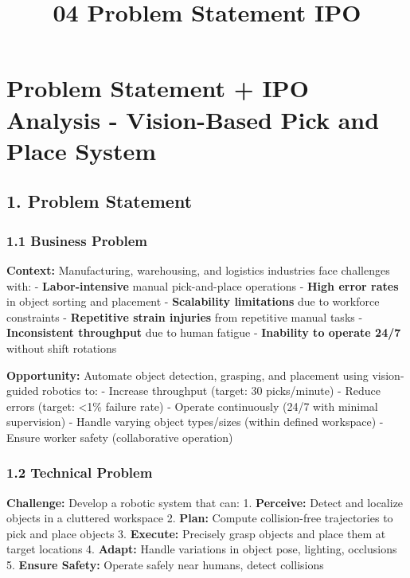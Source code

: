 \documentclass[
]{article}
\title{04 Problem Statement IPO}
\author{}
\date{}
\begin{document}
\maketitle

{
\setcounter{tocdepth}{3}
\tableofcontents
}
\hypertarget{problem-statement-ipo-analysis---vision-based-pick-and-place-system}{%
\section{Problem Statement + IPO Analysis - Vision-Based Pick and Place
System}\label{problem-statement-ipo-analysis---vision-based-pick-and-place-system}}

\hypertarget{problem-statement}{%
\subsection{1. Problem Statement}\label{problem-statement}}

\hypertarget{business-problem}{%
\subsubsection{1.1 Business Problem}\label{business-problem}}

\textbf{Context:} Manufacturing, warehousing, and logistics industries
face challenges with: - \textbf{Labor-intensive} manual pick-and-place
operations - \textbf{High error rates} in object sorting and placement -
\textbf{Scalability limitations} due to workforce constraints -
\textbf{Repetitive strain injuries} from repetitive manual tasks -
\textbf{Inconsistent throughput} due to human fatigue -
\textbf{Inability to operate 24/7} without shift rotations

\textbf{Opportunity:} Automate object detection, grasping, and placement
using vision-guided robotics to: - Increase throughput (target: 30
picks/minute) - Reduce errors (target: \textless1\% failure rate) -
Operate continuously (24/7 with minimal supervision) - Handle varying
object types/sizes (within defined workspace) - Ensure worker safety
(collaborative operation)

\hypertarget{technical-problem}{%
\subsubsection{1.2 Technical Problem}\label{technical-problem}}

\textbf{Challenge:} Develop a robotic system that can: 1.
\textbf{Perceive:} Detect and localize objects in a cluttered workspace
2. \textbf{Plan:} Compute collision-free trajectories to pick and place
objects 3. \textbf{Execute:} Precisely grasp objects and place them at
target locations 4. \textbf{Adapt:} Handle variations in object pose,
lighting, occlusions 5. \textbf{Ensure Safety:} Operate safely near
humans, detect collisions
\end{document}

